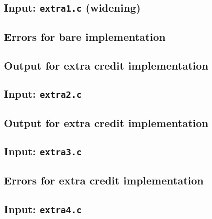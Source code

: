 \documentclass{article}
\begin{document}
\subsection{Input: {\tt extra1.c} (widening)}



\subsection{Errors for bare implementation}



\subsection{Output for extra credit implementation}



\subsection{Input: {\tt extra2.c}}



\subsection{Output for extra credit implementation}



\subsection{Input: {\tt extra3.c}}



\subsection{Errors for extra credit implementation}



\subsection{Input: {\tt extra4.c}}


\end{document}
